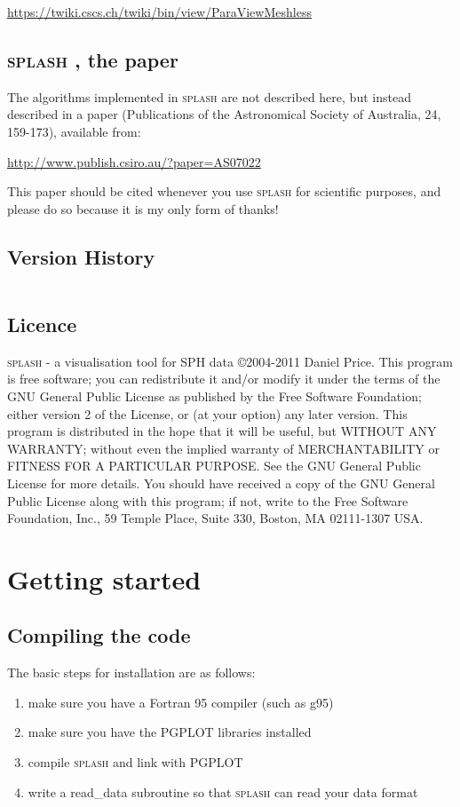 \documentclass[a4paper,10pt]{article}
\def\thisyear{2011 }
\newcommand{\splash}{\textsc{splash }}
\begin{document}
\url{https://twiki.cscs.ch/twiki/bin/view/ParaViewMeshless}

\subsection{\splash, the paper}
 The algorithms implemented in \splash are not described here, but instead described in a paper \citep{splashpaper} (Publications of the Astronomical Society of Australia, 24, 159-173), available from:

\url{http://www.publish.csiro.au/?paper=AS07022}

\noindent This paper should be cited whenever you use \splash for scientific purposes, and please do so because it is my only form of thanks!

\subsection{Version History}

\begin{longtable}{|l|l|p{}|}
\hline

\hline
\end{longtable}

\subsection{Licence}
\splash - a visualisation tool for SPH data \copyright 2004-\thisyear  Daniel Price.
 This program is free software; you can redistribute it and/or modify it under the terms of the GNU General Public License as published by the Free Software Foundation; either version 2 of the License, or (at your option) any later version. This program is distributed in the hope that it will be useful, but WITHOUT ANY WARRANTY; without even the implied warranty of MERCHANTABILITY or FITNESS FOR A PARTICULAR PURPOSE.  See the GNU General Public License for more details. You should have received a copy of the GNU General Public License along with this program; if not, write to the Free Software Foundation, Inc., 59 Temple Place, Suite 330, Boston, MA  02111-1307  USA.

\section{Getting started}%
\subsection{Compiling the code}
The basic steps for installation are as follows:
\begin{enumerate}
\item make sure you have a Fortran 95 compiler (such as g95)
\item make sure you have the PGPLOT libraries installed
\item compile \splash and link with PGPLOT
\item write a read\_data subroutine so that \splash can read your data format
\end{enumerate}
\end{document}

